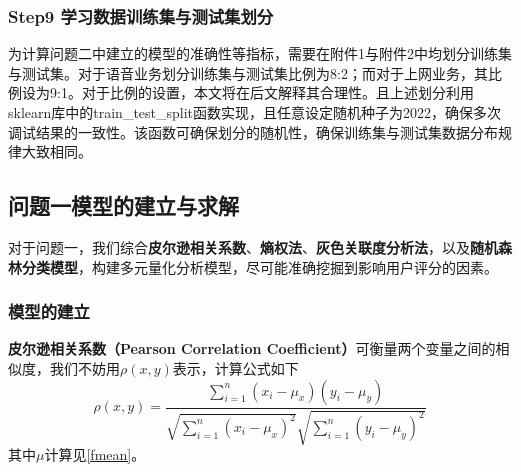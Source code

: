 \documentclass{MathorCupmodeling}
\begin{document}
	\subsubsection*{Step9 学习数据训练集与测试集划分}
	为计算问题二中建立的模型的准确性等指标，需要在附件1与附件2中均划分训练集与测试集。对于语音业务划分训练集与测试集比例为8:2；而对于上网业务，其比例设为9:1。对于比例的设置，本文将在后文解释其合理性。且上述划分利用sklearn库中的train\_test\_split函数实现，且任意设定随机种子为2022，确保多次调试结果的一致性。该函数可确保划分的随机性，确保训练集与测试集数据分布规律大致相同。

	\subsection{问题一模型的建立与求解}
	对于问题一，我们综合\textbf{皮尔逊相关系数}、\textbf{熵权法}、\textbf{灰色关联度分析法}，以及\textbf{随机森林分类模型}，构建多元量化分析模型，尽可能准确挖掘到影响用户评分的因素。
	\subsubsection{模型的建立}
	\textbf{皮尔逊相关系数（Pearson Correlation Coefficient）}可衡量两个变量之间的相似度，我们不妨用$\rho\left(x,y\right)$表示，计算公式\textcolor{blue}{\cite{ppearson1}}如下
	\begin{equation}
	\rho\left(x,y\right)=\frac{\sum\limits_{i=1}^{n}\left(x_{i}-\mu_x\right)\left(y_{i}-\mu_y\right)}{\sqrt{\sum\limits_{i=1}^{n}\left(x_{i}-\mu_x\right)^{2}}\sqrt{\sum\limits_{i=1}^{n}\left(y_{i}-\mu_y\right)^{2}}} \label{fpearson}
	\end{equation}
	其中$\mu$计算见\textcolor{blue}{\eqref{fmean}}。
\end{document}
